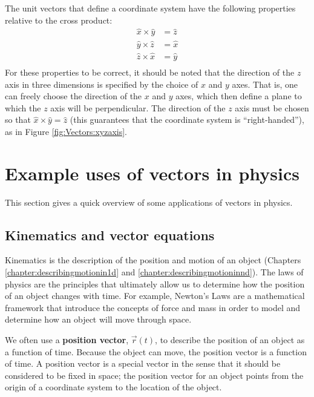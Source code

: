 
The unit vectors that define a coordinate system have the following properties relative to the cross product:
\begin{align*}
\hat x \times \hat y &= \hat z\\
\hat y \times \hat z &= \hat x\\
\hat z \times \hat x &= \hat y\\
\end{align*}
For these properties to be correct, it should be noted that the direction of the $z$ axis in three dimensions is specified by the choice of $x$ and $y$ axes. That is, one can freely choose the direction of the $x$ and $y$ axes, which then define a plane to which the $z$ axis will be perpendicular. The direction of the $z$ axis must be chosen so that $\hat x \times \hat y = \hat z$ (this guarantees that the coordinate system is ``right-handed''), as in Figure \ref{fig:Vectors:xyzaxis}.

\section{Example uses of vectors in physics}
This section gives a quick overview of some applications of vectors in physics.
\subsection{Kinematics and vector equations}
Kinematics is the description of the position and motion of an object (Chapters \ref{chapter:describingmotionin1d} and \ref{chapter:describingmotioninnd}). The laws of physics are the principles that ultimately allow us to determine how the position of an object changes with time. For example, Newton's Laws are a mathematical framework that introduce the concepts of force and mass in order to model and determine how an object will move through space.

We often use a \textbf{position vector}, $\vec r(t)$, to describe the position of an object as a function of time. Because the object can move, the position vector is a function of time. A position vector is a special vector in the sense that it should be considered to be fixed in space; the position vector for an object points from the origin of a coordinate system to the location of the object. 


